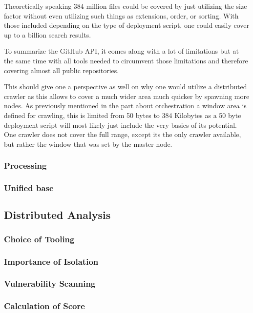 Theoretically speaking 384 million files could be covered by just utilizing the size factor without even utilizing such things as extensions, order, or sorting. With those included depending on the type of deployment script, one could easily cover up to a billion search results.

To summarize the GitHub API, it comes along with a lot of limitations but at the same time with all tools needed to circumvent those limitations and therefore covering almost all public repositories.

This should give one a perspective as well on why one would utilize a distributed crawler as this allows to cover a much wider area much quicker by spawning more nodes. As previously mentioned in the part about orchestration a window area is defined for crawling, this is limited from 50 bytes to 384 Kilobytes as a 50 byte deployment script will most likely just include the very basics of its potential. One crawler does not cover the full range, except its the only crawler available, but rather the window that was set by the master node.

\subsubsection{Processing}


\subsubsection{Unified base}
\subsection{Distributed Analysis}
\subsubsection{Choice of Tooling}
\subsubsection{Importance of Isolation}
\subsubsection{Vulnerability Scanning}
\subsubsection{Calculation of Score}
